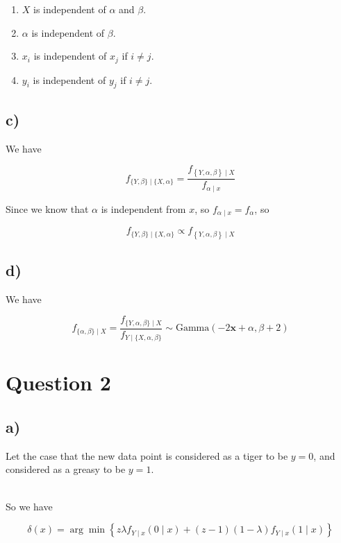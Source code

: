 \documentclass[12pt]{article}
\begin{document}
\begin{flushleft}
\begin{enumerate}[leftmargin=50pt]
\item $X$ is independent of $\alpha$ and $\beta$.
\item $\alpha$ is independent of $\beta$.
\item $x_i$ is independent of $x_j$ if $i \neq j$.
\item $y_i$ is independent of $y_j$ if $i \neq j$.
\end{enumerate}


\subsection*{c)}

\qquad We have

$$
f_{\{Y, \beta\}\mid \{X, \alpha\}} = \frac{f_{\left\{Y, \alpha, \beta\right\}\mid X}}{f_{\alpha\mid x}}
$$

\qquad Since we know that $\alpha$ is independent from $x$, so $f_{\alpha \mid x} = f_{\alpha}$, so

$$
f_{\{Y, \beta\}\mid \{X, \alpha\}} \propto f_{\left\{Y, \alpha, \beta\right\}\mid X}
$$

\subsection*{d)}

\qquad We have

$$
f_{\{\alpha, \beta\} \mid X} = \frac{f_{\{Y, \alpha, \beta\}\mid X} }{f_{Y\mid \{X, \alpha, \beta\}} }\sim \text{Gamma}(-2\bm{x} + \alpha, \beta+2)
$$


\newpage

\section{Question 2}

\subsection*{a)}

\qquad Let the case that the new data point is considered as a tiger to be $y=0$, and considered as a greasy to be $y=1$.

~\\

\qquad So we have

$$
\delta(x) = \arg \min \left\{ z\lambda  f_{Y\mid x}(0\mid x) + (z-1)(1-
\lambda)f_{Y\mid x}(1\mid x)\right\}
$$


\end{flushleft}
\end{document}
